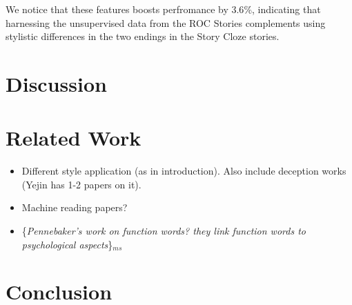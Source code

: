 \documentclass[11pt,a4paper]{article}
\newcommand{\tabref}[1]{Table~\ref{#1}}
\newcommand{\isection}[2]{\section{#1}\label{ssec:#2}}
\newcommand{\isectionb}[1]{\section{#1}\label{ssec:#1}}
\newcommand{\ms}[1]{{\color{cyan}\{\textit{#1}\}$_{ms}$}}
\newcommand{\roy}[1]{\footnote{\color{red}{\textbf{Roy: #1}}}}
\begin{document}
We notice that these features boosts perfromance by $3.6\%$, indicating that harnessing the unsupervised data from the ROC Stories complements using stylistic differences in the two endings in the Story Cloze stories.




\isectionb{Discussion}



\isection{Related Work}{Related}

\begin{itemize}
\item Different style application (as in introduction). Also include deception works (Yejin has 1-2 papers on it). 
\item Machine reading papers? 
\item \ms{Pennebaker's work on function words? they link function words to psychological aspects}
\end{itemize}


\isectionb{Conclusion}




%
%

\newpage


\end{document}
